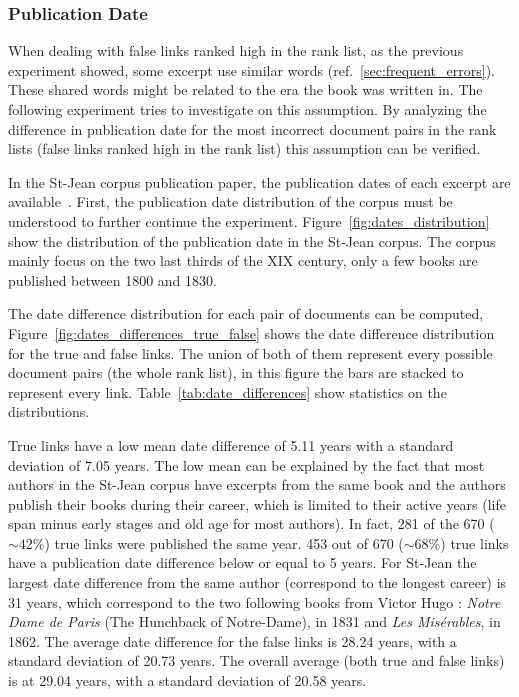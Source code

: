 \subsubsection{Publication Date}

When dealing with false links ranked high in the rank list, as the previous experiment showed, some excerpt use similar words (ref.~\ref{sec:frequent_errors}).
These shared words might be related to the era the book was written in.
The following experiment tries to investigate on this assumption.
By analyzing the difference in publication date for the most incorrect document pairs in the rank lists (false links ranked high in the rank list) this assumption can be verified.

In the St-Jean corpus publication paper, the publication dates of each excerpt are available~\cite{st_jean}.
First, the publication date distribution of the corpus must be understood to further continue the experiment.
Figure~\ref{fig:dates_distribution} show the distribution of the publication date in the St-Jean corpus.
The corpus mainly focus on the two last thirds of the XIX century, only a few books are published between 1800 and 1830.

The date difference distribution for each pair of documents can be computed, Figure~\ref{fig:dates_differences_true_false} shows the date difference distribution for the true and false links.
The union of both of them represent every possible document pairs (the whole rank list), in this figure the bars are stacked to represent every link.
Table~\ref{tab:date_differences} show statistics on the distributions.

True links have a low mean date difference of 5.11 years with a standard deviation of 7.05 years.
The low mean can be explained by the fact that most authors in the St-Jean corpus have excerpts from the same book and the authors publish their books during their career, which is limited to their active years (life span minus early stages and old age for most authors).
In fact, 281 of the 670 ($\sim 42\%$) true links were published the same year.
453 out of 670 ($\sim 68\%$) true links have a publication date difference below or equal to 5 years.
For St-Jean the largest date difference from the same author (correspond to the longest career) is 31 years, which correspond to the two following books from Victor Hugo : \textit{Notre Dame de Paris} (The Hunchback of Notre-Dame), in 1831 and \textit{Les Misérables}, in 1862.
The average date difference for the false links is 28.24 years, with a standard deviation of 20.73 years.
The overall average (both true and false links) is at 29.04 years, with a standard deviation of 20.58 years.

